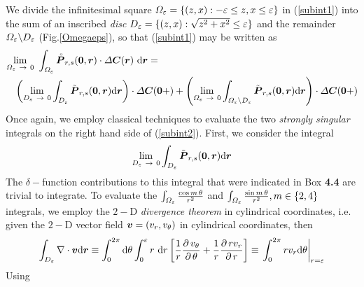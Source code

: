 We divide the infinitesimal square ${\mit \Omega }_{ \varepsilon }= 
\{(z,x): -\varepsilon \le z,x \le \varepsilon\} $ in (\ref{subint1}) into the sum 
of an inscribed {\em disc\/} ${\mit D}_{ \varepsilon }= 
\{(z,x): \sqrt{z^2 + x^2} \le \varepsilon\} $ and the 
remainder ${\mit \Omega}_{ \varepsilon }\backslash{\mit D}_{ \varepsilon 
}$ (Fig.\ref{Omegaeps}),
so that (\ref{subint1}) may be written as
\begin{eqnarray} \label{subint2}
\lefteqn{\lim\limits_{{\mit \Omega }_{ \varepsilon }\ \rightarrow  \ 0}\ 
\int_{{\mit \Omega }_{ \varepsilon }}{\rf{\bmi  P}_{r,s}}({\bf 0},{\bmi  r}) \cdot 
{\mit \Delta}{\bmi C}({\bmi  r})\ 
{\rm d}{\bmi r}
=}\\
&&\left(\lim\limits_{{\mit D }_{ \varepsilon }\ \rightarrow  \ 
0}\int_{{\mit D }_{ \varepsilon }}{\tilde{\bmi  P}_{r,s}}({\bf 
0},{\bmi  r}){\rm d}{\bmi r}\right) \cdot{\mit \Delta}{\bmi C}({\bf 
0}+)
+
\left(\lim\limits_{{\mit \Omega }_{ \varepsilon }\ \rightarrow  \ 
0}\int_{{\mit \Omega }_{ \varepsilon }\backslash
{\mit D}_{ \varepsilon }}{\tilde{\bmi  P}_{r,s}}({\bf 
0},{\bmi  r}){\rm d}{\bmi r}\right) \cdot{\mit \Delta}{\bmi C}({\bf 
0}+)\nonumber
\end{eqnarray}
Once again, we employ classical techniques to evaluate the two {\em 
strongly singular \/} integrals on the right hand side of (\ref{subint2}).
First, we consider the integral
\[
\lim\limits_{{\mit D }_{ \varepsilon }\ \rightarrow  \ 
0}\int_{{\mit D}_{ \varepsilon }}{\tilde{\bmi  P}_{r,s}}({\bf 
0},{\bmi  r}){\rm d}{\bmi r}
\]
The $\delta-$function contributions to this integral that were indicated 
in {\sc Box} {\bf 4.4} are trivial to integrate. To evaluate the
$\int_{{\mit \Omega}_{\varepsilon}}{{\cos m\,\theta }\over {{r^2}}}$ and 
$\int_{{\mit \Omega}_{\varepsilon}}{{\sin m\,\theta }\over {{r^2}}}, m\in 
\{2,4\}$ integrals,  we employ the 
$2-$D {\em divergence theorem\/} in cylindrical coordinates, i.e.
given the $2-$D vector field ${\mbox{\boldmath$\mit v$\unboldmath}}=({v}_{r},{v}_{\theta })$ in 
cylindrical coordinates, then
\begin{equation} \label{divthm}
\int_{{\mit D }_{ \varepsilon }}^{} \nabla \cdot   
{\bmi v} {\rm d}{\bmi r} \equiv \int_{  0}^{  2 \pi }  {\rm d} \theta 
\int_{  0}^{\varepsilon }  r\ 
{\rm d}r\left[{{\frac{1}{r}}{\frac{ \partial   \,{v}_{ \theta }}{ 
\partial   \, \theta }}+{\frac{1}{r}}{\frac{ \partial   
\,r{v}_{r}}{ \partial   \, r }}}\right] \equiv 
\left.\int_{  0}^{  2 \pi }r {  v}_{  
r}  {\rm d} \theta \right|_{r=\varepsilon}
\end{equation} 
 Using

